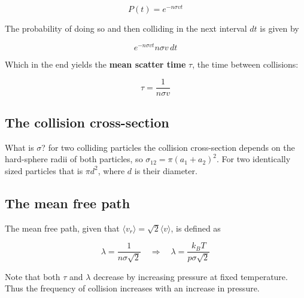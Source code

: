 \documentclass[a4paper]{article}
\begin{document}
\begin{equation}
	P(t)=e^{-n\sigma vt}
\end{equation}

The probability of doing so and then colliding in the next interval $dt$ is given by

\begin{equation}
	e^{-n\sigma vt}n\sigma v\,dt
\end{equation}

Which in the end yields the \textbf{mean scatter time} $\tau$, the time between collisions:

\begin{equation}
	\tau = \frac{1}{n\sigma v}
\end{equation}

\subsection{The collision cross-section}

What is $\sigma$? for two colliding particles the collision cross-section depends on the hard-sphere radii of both particles, so $\sigma_{12}=\pi(a_1+a_2)^2$. For two identically sized particles that is $\pi d^2$, where $d$ is their diameter.

\subsection{The mean free path}

The mean free path, given that $\langle v_r\rangle=\sqrt{2}\langle v\rangle$, is defined as

\begin{equation}
	\lambda = \frac{1}{n\sigma\sqrt{2}}\quad\Rightarrow\quad \lambda = \frac{k_BT}{p\sigma\sqrt{2}}
\end{equation}

Note that both $\tau$ and $\lambda$ decrease by increasing pressure at fixed temperature. Thus the frequency of collision increases with an increase in pressure.
\end{document}
